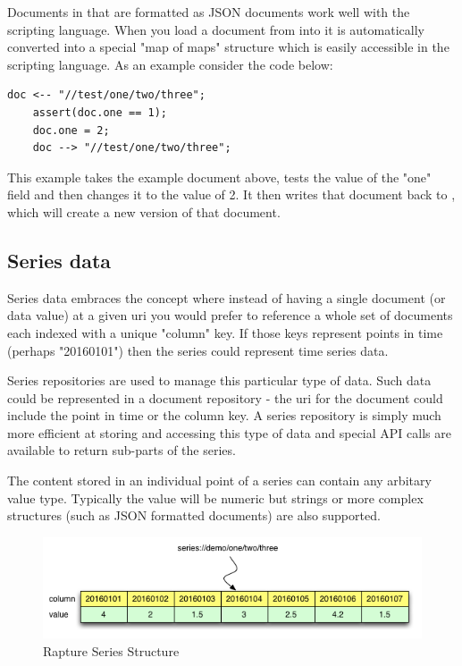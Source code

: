 Documents in \Rapture that are formatted as JSON documents work well with the \Reflex scripting language. When
you load a document from \Rapture into \Reflex it is automatically converted into a special "map of maps" structure
which is easily accessible in the scripting language. As an example consider the code below:

\begin{lstlisting}[caption={Reflex document example}, language=reflex]
  doc <-- "//test/one/two/three";
	assert(doc.one == 1);
	doc.one = 2;
	doc --> "//test/one/two/three";
\end{lstlisting}

This example takes the example document above, tests the value of the "one" field and then
changes it to the value of 2. It then writes that document back to \Rapture, which will create a new
version of that document.

\subsection{Series data}

Series data embraces the concept where instead of having a single document (or data value) at a given
uri you would prefer to reference a whole set of documents each indexed with a unique "column" key. If those
keys represent points in time (perhaps "20160101") then the series could represent time series data.

Series repositories are used to manage this particular type of data. Such data could be represented in a document
repository - the uri for the document could include the point in time or the column key. A series repository is simply
much more efficient at storing and accessing this type of data and special API calls are available to return sub-parts of
the series.

The content stored in an individual point of a series can contain any arbitary value type. Typically the value will be
numeric but strings or more complex structures (such as JSON formatted documents) are also supported.

\begin{figure}[htb]
\centering
\includegraphics[scale=0.7]{Graphics/SeriesExplain}
\caption{Rapture Series Structure}
\label{fig:RaptureSeriesStructure}
\end{figure}

